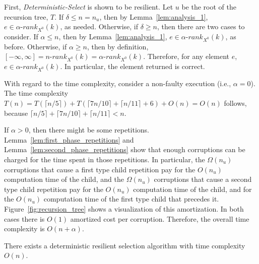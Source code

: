 \documentclass{llncs}
\begin{document}
\begin{pf}
First, \emph{Deterministic-Select} is shown to be resilient. Let $u$ be the root of the recursion tree, $T$. If $\delta \leq n = n_u$, then by Lemma~\ref{lem:analysis_1}, $e \in \alpha\text{-}rank_{X^0}(k)$, as needed. Otherwise, if $\delta \geq n$, then there are two cases to consider. If $\alpha \leq n$, then by Lemma~\ref{lem:analysis_1}, $e \in \alpha\text{-}rank_{X^0}(k)$, as before. Otherwise, if $\alpha \geq n$, then by definition, $[-\infty,\infty] = n\text{-}rank_{X^0}(k) = \alpha\text{-}rank_{X^0}(k)$. Therefore, for any element $e$, $e \in \alpha\text{-}rank_{X^0}(k)$. In particular, the element returned is correct.

With regard to the time complexity, consider a non-faulty execution (i.e., $\alpha = 0$). The time complexity $T(n) = T(\lceil n/5 \rceil) + T(\lceil 7n/10 \rceil + \lceil n/11 \rceil + 6) + O(n) = O(n)$ follows, because $\lceil n/5 \rceil + \lceil 7n/10 \rceil + \lceil n/11 \rceil < n$.

If $\alpha > 0$, then there might be some repetitions. Lemma~\ref{lem:first_phase_repetitions} and Lemma~\ref{lem:second_phase_repetitions} show that enough corruptions can be charged for the time spent in those repetitions. In particular, the $\Omega(n_u)$ corruptions that cause a first type child repetition pay for the $O(n_u)$ computation time of the child, and the $\Omega(n_u)$ corruptions that cause a second type child repetition pay for the $O(n_u)$ computation time of the child, and for the $O(n_u)$ computation time of the first type child that precedes it. Figure~\ref{fig:recursion_tree} shows a visualization of this amortization. In both cases there is $O(1)$ amortized cost per corruption. Therefore, the overall time complexity is $O(n+\alpha)$.
\end{pf}


























\begin{theorem}\label{theorem:det_select}
There exists a deterministic resilient selection algorithm with time complexity $O(n)$.
\end{theorem}
\end{document}
